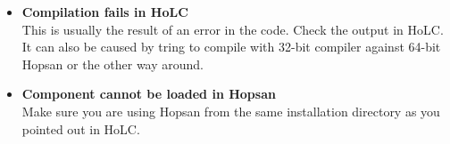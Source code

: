 \documentclass[a4paper,pdftex]{article}
\begin{document}
\begin{tutenumerate}
\vspace{-\baselineskip}
\begin{itemize} %
\item \textbf{Compilation fails in HoLC}\\
This is usually the result of an error in the code. Check the output in HoLC. It can also be caused by tring to compile with 32-bit compiler against 64-bit Hopsan or the other way around.
\item \textbf{Component cannot be loaded in Hopsan}\\
Make sure you are using Hopsan from the same installation directory as you pointed out in HoLC.
\end{itemize}

\end{tutenumerate}
 	
\end{document}

